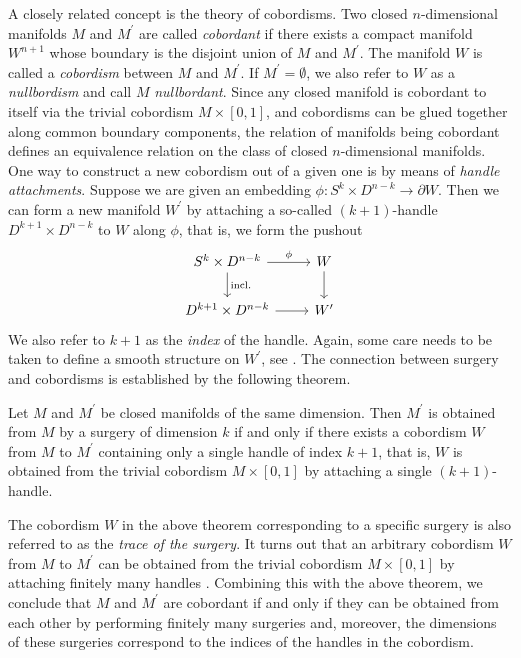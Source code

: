 A closely related concept is the theory of cobordisms. Two closed $n$-dimensional manifolds $M$ and $M^\prime$ are called \textit{cobordant} if there exists a compact manifold $W^{n+1}$ whose boundary is the disjoint union of $M$ and $M^\prime$. The manifold $W$ is called a \textit{cobordism} between $M$ and $M^\prime$. If $M^\prime = \emptyset$, we also refer to $W$ as a \textit{nullbordism} and call $M$ \textit{nullbordant}. Since any closed manifold is cobordant to itself via the trivial cobordism $M \times [0,1]$, and cobordisms can be glued together along common boundary components, the relation of manifolds being cobordant defines an equivalence relation on the class of closed $n$-dimensional manifolds. One way to construct a new cobordism out of a given one is by means of \textit{handle attachments}. Suppose we are given an embedding $\phi \colon S^k \times D^{n-k} \to \partial W$. Then we can form a new manifold $W^\prime$ by attaching a so-called $(k+1)$-handle $D^{k+1} \times D^{n-k}$ to $W$ along $\phi$, that is, we form the pushout 
\[\begin{tikzcd}
	{S^k \times D^{n-k}} & W \\
	{D^{k+1} \times D^{n-k}} & {W^\prime}
	\arrow["\phi", from=1-1, to=1-2]
	\arrow["{\mathrm{incl.}}", from=1-1, to=2-1]
	\arrow[from=1-2, to=2-2]
	\arrow[from=2-1, to=2-2]
\end{tikzcd}\]
We also refer to $k+1$ as the \textit{index} of the handle.
Again, some care needs to be taken to define a smooth structure on $W^\prime$, see \cite[Chapter VI]{kosinski2013differential}. The connection between surgery and cobordisms is established by the following theorem. 

\begin{theorem}
    Let $M$ and $M^\prime$ be closed manifolds of the same dimension. Then $M^\prime$ is obtained from $M$ by a surgery of dimension $k$ if and only if there exists a cobordism $W$ from $M$ to $M^\prime$ containing only a single handle of index $k+1$, that is, $W$ is obtained from the trivial cobordism $M \times [0,1]$ by attaching a single $(k+1)$-handle.
\end{theorem}

The cobordism $W$ in the above theorem corresponding to a specific surgery is also referred to as the \emph{trace of the surgery}. It turns out that an arbitrary cobordism $W$ from $M$ to $M^\prime$ can be obtained from the trivial cobordism $M \times [0,1]$ by attaching finitely many handles \cite[Chapter VII, Thm. 1.1]{kosinski2013differential}. Combining this with the above theorem, we conclude that $M$ and $M^\prime$ are cobordant if and only if they can be obtained from each other by performing finitely many surgeries and, moreover, the dimensions of these surgeries correspond to the indices of the handles in the cobordism.


